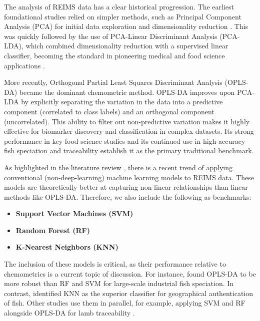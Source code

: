 The analysis of REIMS data has a clear historical progression. The earliest foundational studies relied on simpler methods, such as Principal Component Analysis (PCA) for initial data exploration and dimensionality reduction \citep{Schaefer2009}. This was quickly followed by the use of PCA-Linear Discriminant Analysis (PCA-LDA), which combined dimensionality reduction with a supervised linear classifier, becoming the standard in pioneering medical and food science applications \citep{Balog2010, Balog2013, Balog2016}.

More recently, Orthogonal Partial Least Squares Discriminant Analysis (OPLS-DA) \citep{Bylesjoe2006} became the dominant chemometric method. OPLS-DA improves upon PCA-LDA by explicitly separating the variation in the data into a predictive component (correlated to class labels) and an orthogonal component (uncorrelated). This ability to filter out non-predictive variation makes it highly effective for biomarker discovery and classification in complex datasets. Its strong performance in key food science studies \citep{Verplanken2016, Black2017, Black2019} and its continued use in high-accuracy fish speciation \citep{Shen2020, Shen2022} and traceability \citep{Gkarane2025, Gao2025} establish it as the primary traditional benchmark.

As highlighted in the literature review \citep{Xue2025}, there is a recent trend of applying conventional (non-deep-learning) machine learning models to REIMS data. These models are theoretically better at capturing non-linear relationships than linear methods like OPLS-DA. Therefore, we also include the following as benchmarks:

\begin{itemize}
    \item \textbf{Support Vector Machines (SVM)}
    \item \textbf{Random Forest (RF)}
    \item \textbf{K-Nearest Neighbors (KNN)}
\end{itemize}

The inclusion of these models is critical, as their performance relative to chemometrics is a current topic of discussion. For instance, \citet{De2023} found OPLS-DA to be more robust than RF and SVM for large-scale industrial fish speciation. In contrast, \citet{Lu2024} identified KNN as the superior classifier for geographical authentication of fish. Other studies use them in parallel, for example, applying SVM and RF alongside OPLS-DA for lamb traceability \citep{Gao2025}.

